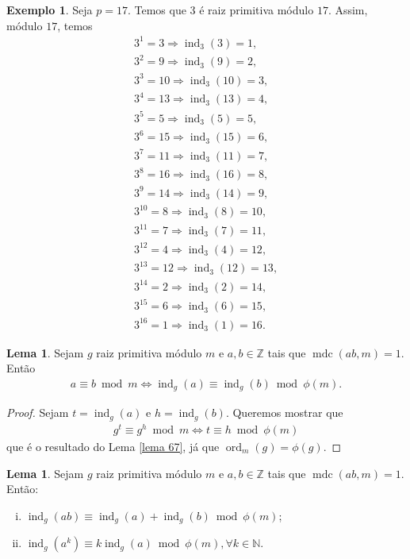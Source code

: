 \documentclass[a4paper,11pt,twoside, leqno]{article}
\DeclareMathOperator{\mdc}{mdc}
\DeclareMathOperator{\Ord}{ord}
\DeclareMathOperator{\ind}{ind}
\theoremstyle{definition}
\newtheorem{lemma}[theorem]{Lema}
\newtheorem*{example}{Exemplo}
\begin{document}
\begin{example}
	Seja $p=17$. Temos que $3$ é raiz primitiva módulo $17$. Assim, módulo $17$, temos
	\begin{align*}
	3^1 = 3 \Longrightarrow \ind_3(3) = 1, \\
	3^2 = 9 \Longrightarrow \ind_3(9) = 2, \\
	3^3 = 10 \Longrightarrow \ind_3(10) = 3, \\
	3^4 = 13 \Longrightarrow \ind_3(13) = 4, \\
	3^5 = 5 \Longrightarrow \ind_3(5) = 5, \\
	3^6 = 15 \Longrightarrow \ind_3(15) = 6, \\
	3^7 = 11 \Longrightarrow \ind_3(11) = 7, \\
	3^8 = 16 \Longrightarrow \ind_3(16) = 8, \\
	3^9 = 14 \Longrightarrow \ind_3(14) = 9, \\
	3^{10} = 8 \Longrightarrow \ind_3(8) = 10, \\
	3^{11} = 7 \Longrightarrow \ind_3(7) = 11, \\
	3^{12} = 4 \Longrightarrow \ind_3(4) = 12, \\
	3^{13} = 12 \Longrightarrow \ind_3(12) = 13, \\
	3^{14} = 2 \Longrightarrow \ind_3(2) = 14, \\
	3^{15} = 6 \Longrightarrow \ind_3(6) = 15, \\
	3^{16} = 1 \Longrightarrow \ind_3(1) = 16.
	\end{align*}
\end{example}
\begin{lemma}
	\label{lema 80}
	Sejam $g$ raiz primitiva módulo $m$ e $a,b\in\mathbb{Z}$ tais que $\mdc(ab,m) = 1$. Então
	\begin{align*}
	a\equiv b\bmod m\Longleftrightarrow \ind_g(a) \equiv \ind_g(b)\bmod \phi(m).
	\end{align*}
\end{lemma}
\begin{proof}
	Sejam $t = \ind_g(a)$ e $h = \ind_g(b)$. Queremos mostrar que 
	\begin{align*}
	g^t\equiv g^h\bmod m\Longleftrightarrow t\equiv h\bmod \phi(m)
	\end{align*}
	que é o resultado do Lema \eqref{lema 67}, já que $\Ord_m(g) = \phi(g)$.
\end{proof}
\begin{lemma}
	\label{lema 81}
	Sejam $g$ raiz primitiva módulo $m$ e $a,b\in\mathbb{Z}$ tais que $\mdc(ab,m) = 1$. Então:
	\begin{enumerate}[(i)]
		\item $\ind_g(ab) \equiv \ind_g(a) + \ind_g(b)\bmod\phi(m)$;
		\item $\ind_g(a^k)\equiv k\ind_g(a)\bmod\phi(m), \forall k\in\mathbb{N}$.
	\end{enumerate}
\end{lemma}
\end{document}
